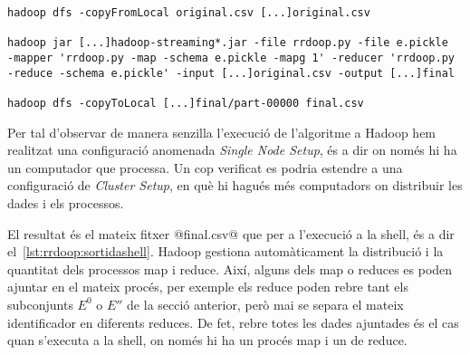 \begin{lstlisting}[style=sh,caption=Execució a Hadoop de
  rrdoop.py,label=lst:rrdoop:hadoop]
hadoop dfs -copyFromLocal original.csv [...]original.csv

hadoop jar [...]hadoop-streaming*.jar -file rrdoop.py -file e.pickle  -mapper 'rrdoop.py -map -schema e.pickle -mapg 1' -reducer 'rrdoop.py -reduce -schema e.pickle' -input [...]original.csv -output [...]final

hadoop dfs -copyToLocal [...]final/part-00000 final.csv
\end{lstlisting}

Per tal d'observar de manera senzilla l'execució de l'algoritme a
Hadoop hem realitzat una configuració anomenada \emph{Single Node
  Setup}, és a dir on només hi ha un computador que processa.  Un cop
verificat es podria estendre a una configuració de \emph{Cluster
  Setup}, en què hi hagués més computadors on distribuir les dades i
els processos.


El resultat és el mateix fitxer @final.csv@ que per a l'execució a la
shell, és a dir el~\autoref{lst:rrdoop:sortidashell}.  Hadoop gestiona
automàticament la distribució i la quantitat dels processos map i
reduce. Així, alguns dels map o reduces es poden ajuntar en el mateix
procés, per exemple els reduce poden rebre tant els subconjunts $E^0$
o $E''$ de la secció anterior, però mai se separa el mateix
identificador en diferents reduces. De fet, rebre totes les dades
ajuntades és el cas quan s'executa a la shell, on només hi ha un
procés map i un de reduce.














